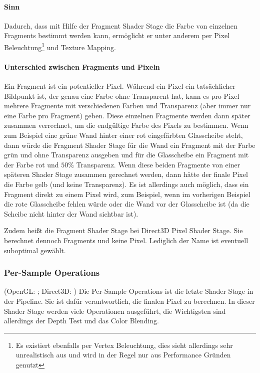 \paragraph{Sinn}
Dadurch, dass mit Hilfe der Fragment Shader Stage die Farbe von einzelnen Fragments bestimmt werden kann, ermöglicht er unter anderem per Pixel Beleuchtung\footnote{Es existiert ebenfalls per Vertex Beleuchtung, dies sieht allerdings sehr unrealistisch aus und wird in der Regel nur aus Performance Gründen genutzt} und Texture Mapping.

\paragraph{Unterschied zwischen Fragments und Pixeln}
\label{sec:shaderpipeline:stages:fragshader:fragmentvspixel}
Ein Fragment ist ein potentieller Pixel. Während ein Pixel ein tatsächlicher Bildpunkt ist, der genau eine Farbe ohne Transparent hat, kann es pro Pixel mehrere Fragmente mit verschiedenen Farben und Transparenz (aber immer nur eine Farbe pro Fragment) geben. Diese einzelnen Fragmente werden dann später zusammen verrechnet, um die endgültige Farbe des Pixels zu bestimmen. Wenn zum Beispiel eine grüne Wand hinter einer rot eingefärbten Glasscheibe steht, dann würde die Fragment Shader Stage für die Wand ein Fragment mit der Farbe grün und ohne Transparenz ausgeben und für die Glasscheibe ein Fragment mit der Farbe rot und $50\%$ Transparenz. Wenn diese beiden Fragmente von einer späteren Shader Stage zusammen gerechnet werden, dann hätte der finale Pixel die Farbe gelb (und keine Transparenz). Es ist allerdings auch möglich, dass ein Fragment direkt zu einem Pixel wird, zum Beispiel, wenn im vorherigen Beispiel die rote Glasscheibe fehlen würde oder die Wand vor der Glasscheibe ist (da die Scheibe nicht hinter der Wand sichtbar ist).

Zudem heißt die Fragment Shader Stage bei Direct3D Pixel Shader Stage. Sie berechnet dennoch Fragments und keine Pixel. Lediglich der Name ist eventuell suboptimal gewählt.

\subsubsection{Per-Sample Operations}
(OpenGL: \cite{stage_gl_per_sample_ops}; Direct3D: \cite{stage_d3d_per_sample_ops})
Die Per-Sample Operations ist die letzte Shader Stage in der Pipeline. Sie ist dafür verantwortlich, die finalen Pixel zu berechnen. In dieser Shader Stage werden viele Operationen ausgeführt, die Wichtigsten sind allerdings der Depth Test und das Color Blending.

